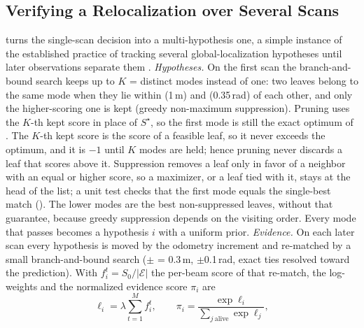 \subsection{Verifying a Relocalization over Several Scans}\label{sec:verify}

 turns the single-scan decision into a multi-hypothesis one, a simple instance of the established practice of tracking several global-localization hypotheses until later observations separate them \citep{gao2019global,garcia2023mhamcl}. \emph{Hypotheses.} On the first scan the branch-and-bound search keeps up to $K$ =  distinct modes instead of one: two leaves belong to the same mode when they lie within  (1\,m) and  (0.35\,rad) of each other, and only the higher-scoring one is kept (greedy non-maximum suppression). Pruning uses the $K$-th kept score in place of $S^\star$, so the first mode is still the exact optimum of . The $K$-th kept score is the score of a feasible leaf, so it never exceeds the optimum, and it is $-1$ until $K$ modes are held; hence pruning never discards a leaf that scores above it. Suppression removes a leaf only in favor of a neighbor with an equal or higher score, so a maximizer, or a leaf tied with it, stays at the head of the list; a unit test checks that the first mode equals the single-best match (). The lower modes are the best non-suppressed leaves, without that guarantee, because greedy suppression depends on the visiting order. Every mode that passes  becomes a hypothesis $i$ with a uniform prior. \emph{Evidence.} On each later scan every hypothesis is moved by the odometry increment and re-matched by a small branch-and-bound search ($\pm$ = 0.3\,m, $\pm$0.1\,rad, exact ties resolved toward the prediction). With $f_i^t=S_0/|\mathcal{E}|$ the per-beam score of that re-match, the log-weights and the normalized evidence score $\pi_i$ are
\begin{equation}\label{eq:verify}
  \ell_i=\lambda\sum_{t=1}^{M} f_i^t,\qquad \pi_i=\frac{\exp\ell_i}{\sum_{j\ \mathrm{alive}}\exp\ell_j},
\end{equation}
